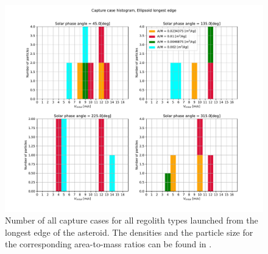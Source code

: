 \begin{figure}[htb]
\centering
\captionsetup{justification=centering}
\includegraphics[width=\textwidth, height=0.5\textheight, keepaspectratio=true]{longest_edge_perturbations/multiple_regolith_types/allPhases_captureCases.pdf}
\caption{Number of all capture cases for all regolith types launched from the longest edge of the asteroid. The densities and the particle size for the corresponding area-to-mass ratios can be found in .}
\label{fig:longestEdge_allParticles_capture_hist}
\end{figure}
\FloatBarrier
